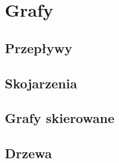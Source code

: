 \section{Grafy}

\subsection{Przepływy}

\subsection{Skojarzenia}

\subsection{Grafy skierowane}

\subsection{Drzewa}
